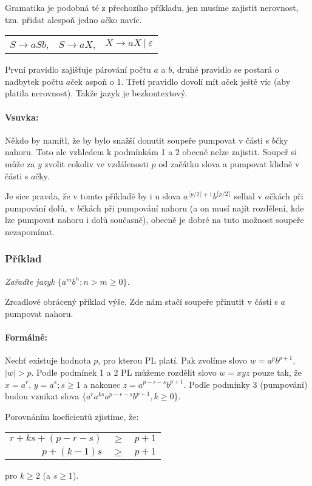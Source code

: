 \documentclass{article}
\begin{document}
Gramatika je podobná té z přechozího příkladu, jen musíme zajistit nerovnost, tzn. přidat alespoň jedno $a$čko navíc.

\begin{tabular}{ccc}
$S \rightarrow aSb$,   &  $S \rightarrow aX$,   &  $X \rightarrow aX ~|~ \varepsilon$
\end{tabular}

První pravidlo zajišťuje párování počtu $a$ a $b$, druhé pravidlo se postará o nadbytek počtu $a$ček aspoň o 1. Třetí pravidlo dovolí mít $a$ček ještě víc (aby platila nerovnost). Takže jazyk je bezkontextový.


\paragraph{Vsuvka:}

Někdo by namítl, že by bylo snažší donutit soupeře pumpovat v části s $b$čky nahoru.
Toto ale vzhledem k podmínkám 1 a 2 obecně nelze zajistit.
Soupeř si může za $y$ zvolit cokoliv ve vzdálenosti $p$ od začátku slova a pumpovat klidně v části s $a$čky.

Je sice pravda, že v tomto příkladě by i u slova ${a}^{\lceil p/2 \rceil +1}b^{ \lceil p/2 \rceil }$ selhal v $a$čkách při pumpování dolů, v $b$čkách při pumpování nahoru (a on musí najít rozdělení, kde lze pumpovat nahoru i dolů současně), obecně je dobré na tuto možnost soupeře nezapomínat.

\subsubsection{Příklad}
\textit{Zařaďte jazyk $\{a^mb^n; n > m \geq 0\}$.}

Zrcadlové obrácený příklad výše. Zde nám stačí soupeře přinutit v části s $a$ pumpovat nahoru.

\paragraph{Formálně:}
Nechť existuje hodnota $p$, pro kterou PL platí. Pak zvolíme slovo $w = a^pb^{p+1}$, $|w| > p$.
Podle podmínek 1 a 2 PL můžeme rozdělit slovo $w = xyz$ pouze tak, že $x=a^r$, $y = a^s; s \geq 1$ a nakonec $z=a^{p-r-s}b^{p+1}$.
Podle podmínky 3 (pumpování) budou vznikat slova $\{a^ra^{ks}a^{p-r-s}b^{p+1}, k\geq 0\}$.

Porovnáním koeficientů zjistíme, že:

\begin{tabular}{rcl}
$r+ks+(p-r-s)$  &  $\geq$  &  $p+1$\\
$p+(k-1)s $      &  $\geq$  &  $p+1$\\
\end{tabular} pro $k \geq 2$ (a $s \geq 1$).
\end{document}
